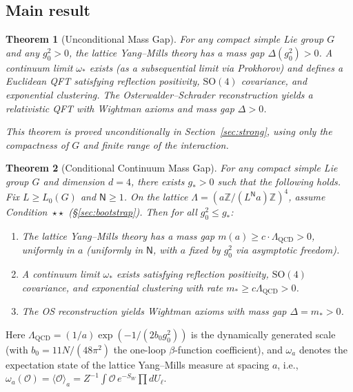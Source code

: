 \documentclass[11pt,a4paper]{article}
\theoremstyle{plain}
\newtheorem{theorem}{Theorem}[section]
\theoremstyle{definition}
\theoremstyle{remark}
\newcommand{\Z}{\mathbb{Z}}
\newcommand{\SO}{\mathrm{SO}}
\newcommand{\cO}{\mathcal{O}}
\begin{document}
\subsection{Main result}

\begin{theorem}[Unconditional Mass Gap]\label{thm:MAIN_STRONG}
For any compact simple Lie group $G$ and any $g_0^2 > 0$,
the lattice Yang--Mills theory has a mass gap $\Delta(g_0^2) > 0$.
A continuum limit $\omega_*$ exists (as a subsequential limit
via Prokhorov) and defines a Euclidean QFT satisfying reflection
positivity, $\SO(4)$ covariance, and exponential clustering.
The Osterwalder--Schrader reconstruction yields a relativistic
QFT with Wightman axioms and mass gap $\Delta > 0$.

This theorem is proved unconditionally in Section~\ref{sec:strong},
using only the compactness of $G$ and finite range of the interaction.
\end{theorem}

\begin{theorem}[Conditional Continuum Mass Gap]\label{thm:MAIN}
For any compact simple Lie group $G$ and dimension $d = 4$,
there exists $g_* > 0$ such that the following holds.
Fix $L \ge L_0(G)$ and $\mathsf{N} \ge 1$.
On the lattice $\Lambda = (a\Z / (L^{\mathsf{N}} a)\Z)^4$,
assume Condition~$\star\star$ (\S\ref{sec:bootstrap}).
Then for all $g_0^2 \le g_*$:
\begin{enumerate}[label=\textup{(\roman*)},nosep]
  \item The lattice Yang--Mills theory has a mass gap
    $m(a) \ge c \cdot \Lambda_{\mathrm{QCD}} > 0$, uniformly
    in $a$ (uniformly in $\mathsf{N}$, with $a$ fixed by
    $g_0^2$ via asymptotic freedom).
  \item A continuum limit $\omega_*$ exists satisfying
    reflection positivity, $\SO(4)$ covariance, and
    exponential clustering with rate $m_* \ge c\Lambda_{\mathrm{QCD}} > 0$.
  \item The OS reconstruction yields Wightman axioms with
    mass gap $\Delta = m_* > 0$.
\end{enumerate}
\end{theorem}

\noindent Here $\Lambda_{\mathrm{QCD}} = (1/a)\exp(-1/(2b_0 g_0^2))$
is the dynamically generated scale (with $b_0 = 11N/(48\pi^2)$
the one-loop $\beta$-function coefficient), and $\omega_a$
denotes the expectation state of the lattice Yang--Mills
measure at spacing $a$, i.e., $\omega_a(\cO)
= \langle\cO\rangle_a = Z^{-1}\int\cO\,e^{-S_W}\prod dU_\ell$.
\end{document}

